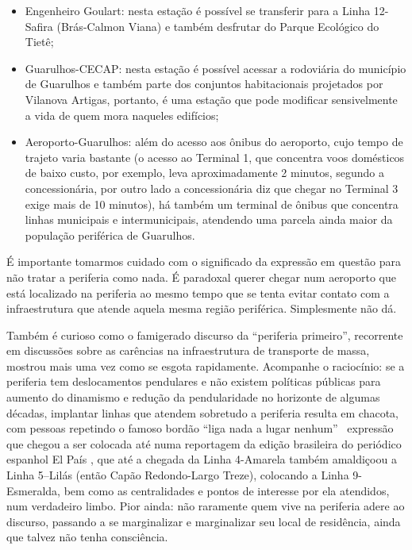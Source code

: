 \documentclass[11pt,fleqn]{book} %
\begin{document}
\begin{itemize}
	\item Engenheiro Goulart: nesta estação é possível se transferir para a Linha 12-Safira (Brás-Calmon Viana) e também desfrutar do Parque Ecológico do Tietê;
	\item Guarulhos-CECAP: nesta estação é possível acessar a rodoviária do município de Guarulhos e também parte dos conjuntos habitacionais projetados por Vilanova Artigas, portanto, é uma estação que pode modificar sensivelmente a vida de quem mora naqueles edifícios;
	\item Aeroporto-Guarulhos: além do acesso aos ônibus do aeroporto, cujo tempo de trajeto varia bastante (o acesso ao Terminal 1, que concentra voos domésticos de baixo custo, por exemplo, leva aproximadamente 2 minutos, segundo a concessionária, por outro lado a concessionária diz que chegar no Terminal 3 exige mais de 10 minutos), há também um terminal de ônibus que concentra linhas municipais e intermunicipais, atendendo uma parcela ainda maior da população periférica de Guarulhos.
\end{itemize}

É importante tomarmos cuidado com o significado da expressão em questão para não tratar a periferia como nada. É paradoxal querer chegar num aeroporto que está localizado na periferia ao mesmo tempo que se tenta evitar contato com a infraestrutura que atende aquela mesma região periférica. Simplesmente não dá.

Também é curioso como o famigerado discurso da “periferia primeiro”, recorrente em discussões sobre as carências na infraestrutura de transporte de massa, mostrou mais uma vez como se esgota rapidamente. Acompanhe o raciocínio: se a periferia tem deslocamentos pendulares e não existem políticas públicas para aumento do dinamismo e redução da pendularidade no horizonte de algumas décadas, implantar linhas que atendem sobretudo a periferia resulta em chacota, com pessoas repetindo o famoso bordão “liga nada a lugar nenhum” \textemdash\ expressão que chegou a ser colocada até numa reportagem da edição brasileira do periódico espanhol El País \textemdash, que até a chegada da Linha 4-Amarela também amaldiçoou a Linha 5–Lilás (então Capão Redondo-Largo Treze), colocando a Linha 9-Esmeralda, bem como as centralidades e pontos de interesse por ela atendidos, num verdadeiro limbo. Pior ainda: não raramente quem vive na periferia adere ao discurso, passando a se marginalizar e marginalizar seu local de residência, ainda que talvez não tenha consciência.
\end{document}
